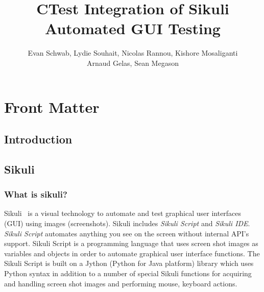 \documentclass{InsightArticle}
\title{CTest Integration of Sikuli Automated GUI Testing}
\author{Evan Schwab, Lydie Souhait, Nicolas Rannou, Kishore Mosaliganti\\
Arnaud Gelas, Sean Megason}
\newcommand{\IJhandlerIDnumber}{3196}
\begin{document}
\IJhandlefooter{\IJhandlerIDnumber}


\ifpdf
\else
\fi

\maketitle

\ifhtml
\chapter*{Front Matter\label{front}}
\fi

\begin{abstract}
\noindent
\end{abstract}

\IJhandlenote{\IJhandlerIDnumber}

\tableofcontents
\section{Introduction}

\section{Sikuli}

\subsection{What is sikuli?}

Sikuli~\cite{Sikuli:Documentation,Sikuli:Website,Yeh:2009:Sikuli} is a visual
technology to automate and test graphical user interfaces (GUI) using images
(screenshots). Sikuli includes \emph{Sikuli Script} and \emph{Sikuli IDE}.\\

\emph{Sikuli Script} automates anything you see on the screen without internal
API's support. Sikuli Script is a programming language that uses screen shot
images as variables and objects in order to automate graphical user interface
functions. The Sikuli Script is built on a Jython (Python for Java platform)
library which uses Python syntax in addition to a number of special Sikuli
functions for acquiring and handling screen shot images and performing mouse,
keyboard actions.\\
\end{document}
